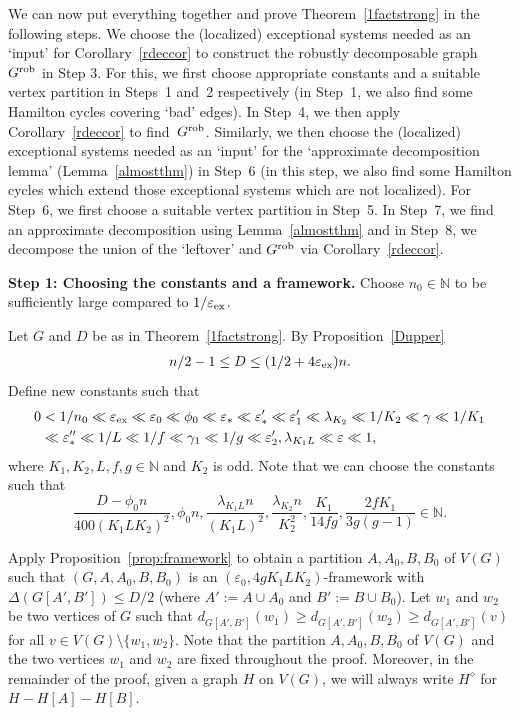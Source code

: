 \documentclass{memo-l}
\def\COMMENT#1{}
\def\eps{\varepsilon}
\def\epszero{\eps_0}
\numberwithin{section}{chapter}
\numberwithin{equation}{section}
\numberwithin{firstthm}{section}
\numberwithin{figure}{section}
\begin{document}
{We can now put everything together and prove Theorem~\ref{1factstrong} in the following steps. We choose the (localized) exceptional systems needed as an `input'
for Corollary~\ref{rdeccor} to construct the robustly decomposable graph~$G^{\rm rob}$ in Step 3.
For this, we first  choose appropriate constants and a suitable vertex partition in Steps~1 and~2 respectively
(in Step~1, we also find some Hamilton cycles covering `bad' edges).
In Step~4, we then apply Corollary~\ref{rdeccor} to find~$G^{\rm rob}$.
Similarly, we then choose the (localized) exceptional systems needed as an `input'
for the `approximate decomposition lemma' (Lemma~\ref{almostthm}) in Step~6
(in this step, we also find some Hamilton cycles which extend those exceptional systems which are not localized).
For Step~6, we first choose a suitable vertex partition in Step~5.
In Step~7, we find an approximate decomposition using Lemma~\ref{almostthm}
and in Step~8, we decompose the union of  the `leftover' and $G^{\rm rob}$ via Corollary~\ref{rdeccor}.

\removelastskip{}\medskip{}

\noindent\textbf{Step 1: Choosing the constants and a framework.}
Choose $n_0\in\mathbb{N}$ to be sufficiently large compared to $1/\eps_{\rm ex}$.%
    \COMMENT{Daniela: new sentence}
Let $G$ and $D$ be as in Theorem~\ref{1factstrong}. 
By Proposition~\ref{Dupper}
\begin{align}
	n/2-1 \le D \le (1/2 + 4 \eps_{\rm ex} )n. \label{eq:Dupper}
\end{align}
Define new constants such that 
\begin{align*}
0 & < 1/n_0 \ll \eps_{\rm ex} \ll  \epszero \ll \phi_0  \ll \eps_* \ll \eps'_*   \ll  \eps_1' \ll \lambda_{K_2} \ll 1/K_2  \ll \gamma \ll  1/K_1  \\
 & \ll  \eps''_* \ll 1/L \ll 1/f \ll \gamma_1  \ll 1/g \ll \eps_2', \lambda_{K_1L} \ll \eps \ll 1,
\end{align*}
where $K_1, K_2, L, f, g \in  \mathbb{N}$ and $K_2$ is odd. 
Note that we can choose the constants such that
\begin{equation}\label{eq:div}
 \frac{D- \phi_0 n}{400 (K_1 L K_2)^2}, \phi_0 n  ,\frac{\lambda_{K_1L}n}{(K_1L)^2}, \frac{\lambda_{K_2}n}{K_2^2},
\frac{K_1}{14fg},  \frac{2fK_1}{3g(g-1)}  \in \mathbb{N}.
\end{equation}

Apply Proposition~\ref{prop:framework} to obtain a partition $A,A_0,B,B_0$ of $V(G)$ such that $(G,A,A_0,B,B_0)$ is an
$(\eps_0, 4g K_1 L K_2)$-framework with $ \Delta( G [A' , B' ]) \le D/2$ (where $A':=A\cup A_0$ and $B':=B\cup B_0$).
Let $w_1$ and $w_2$ be two vertices of $G$ such that $d_{G[A',B']}(w_1) \ge d_{G[A',B']}(w_2) \ge d_{G[A',B']}(v)$ for all $v \in V(G) \setminus \{w_1,w_2\}$.
Note that the partition $A,A_0,B,B_0$ of $V(G)$ and the two vertices $w_1$ and $w_2$ are fixed throughout the proof. 
Moreover, in the remainder of the proof, given a graph $H$ on $V(G)$, we will always write $H^{\diamond}$ for $H - H[A] - H[B]$.
  
}
\end{document}
